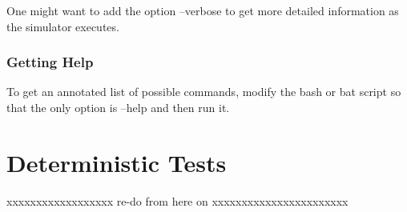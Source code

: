 \documentclass[11pt]{article}
\begin{document}
One might want to add the option --verbose to get more detailed information as the
simulator executes.

\subsubsection{Getting Help}

To get an annotated list of possible commands, modify the bash or bat script
so that the only option is --help and then run it.

\section{Deterministic Tests}

xxxxxxxxxxxxxxxxxx re-do from here on xxxxxxxxxxxxxxxxxxxxxxx
\end{document}
